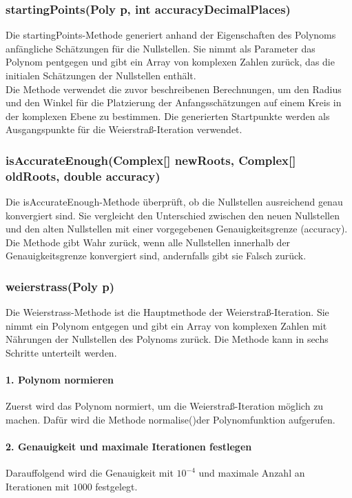 \documentclass[12pt]{article}
\begin{document}
\subsubsection{startingPoints(Poly p, int accuracyDecimalPlaces)}
Die \glqq startingPoints\grqq-Methode generiert anhand der Eigenschaften des Polynoms anfängliche Schätzungen für die Nullstellen. Sie nimmt als Parameter das Polynom \glqq p\grqq\space entgegen und gibt ein Array von komplexen Zahlen zurück, das die initialen Schätzungen der Nullstellen enthält.\\
Die Methode verwendet die zuvor beschreibenen Berechnungen, um den Radius und den Winkel für die Platzierung der Anfangsschätzungen auf einem Kreis in der komplexen Ebene zu bestimmen. Die generierten Startpunkte werden als Ausgangspunkte für die Weierstraß-Iteration verwendet.

\subsubsection{isAccurateEnough(Complex[] newRoots, Complex[] oldRoots, double accuracy)}
Die \glqq isAccurateEnough\grqq-Methode überprüft, ob die Nullstellen ausreichend genau konvergiert sind. Sie vergleicht den Unterschied zwischen den neuen Nullstellen und den alten Nullstellen mit einer vorgegebenen Genauigkeitsgrenze (accuracy).\\
Die Methode gibt Wahr zurück, wenn alle Nullstellen innerhalb der Genauigkeitsgrenze konvergiert sind, andernfalls gibt sie Falsch zurück.

\subsubsection{weierstrass(Poly p)}
Die \glqq Weierstrass\grqq-Methode ist die Hauptmethode der Weierstraß-Iteration. Sie nimmt ein Polynom entgegen und gibt ein Array von komplexen Zahlen mit Nährungen der Nullstellen des Polynoms zurück. Die Methode kann in sechs Schritte unterteilt werden.

\paragraph{1. Polynom normieren}
Zuerst wird das Polynom normiert, um die Weierstraß-Iteration möglich zu machen. Dafür wird die Methode \glqq normalise()\grqq\space der Polynomfunktion aufgerufen.

\paragraph{2. Genauigkeit und maximale Iterationen festlegen}
Darauffolgend wird die Genauigkeit mit $10^{-4}$ und maximale Anzahl an Iterationen mit $1000$ festgelegt.
\end{document}
